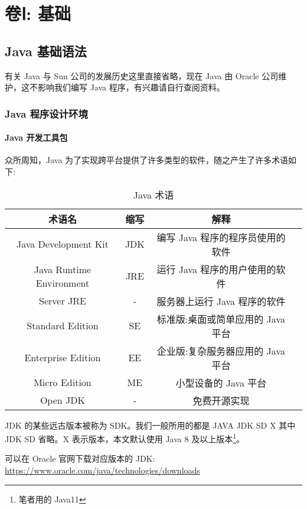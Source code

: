 \part{卷Ⅰ: 基础}
\chapter{Java 基础语法}

有关 Java 与 Sun 公司的发展历史这里直接省略，现在 Java 由 Oracle 公司维护，这不影响我们编写 Java 程序，有兴趣请自行查阅资料。

\section{Java 程序设计环境}
\subsection{Java 开发工具包}

众所周知，Java 为了实现跨平台提供了许多类型的软件，随之产生了许多术语如下:

\begin{table}[H]
    \centering
    \caption{Java 术语}
    \label{table:Java 术语}
    \setlength{\tabcolsep}{4mm}
    \begin{tabular}{c|c|cc}
        \toprule
        \textbf{术语名} & \textbf{缩写} & \textbf{解释} \\
        \midrule
        Java Development Kit & JDK & 编写 Java 程序的程序员使用的软件 \\
        Java Runtime Environment & JRE & 运行 Java 程序的用户使用的软件 \\
        Server JRE & - & 服务器上运行 Java 程序的软件 \\
        Standard Edition & SE & 标准版:桌面或简单应用的 Java 平台 \\
        Enterprise Edition & EE & 企业版:复杂服务器应用的 Java 平台 \\
        Micro Edition & ME & 小型设备的 Java 平台 \\
        Open JDK & - & 免费开源实现 \\
        \bottomrule
    \end{tabular}
\end{table}

JDK 的某些远古版本被称为 SDK。我们一般所用的都是 JAVA JDK SD X 其中 JDK SD 省略。X 表示版本，本文默认使用 Java 8 及以上版本\footnote{笔者用的 Java11}。

可以在 Oracle 官网下载对应版本的 JDK: \url{https://www.oracle.com/java/technologies/downloads}

\newpage